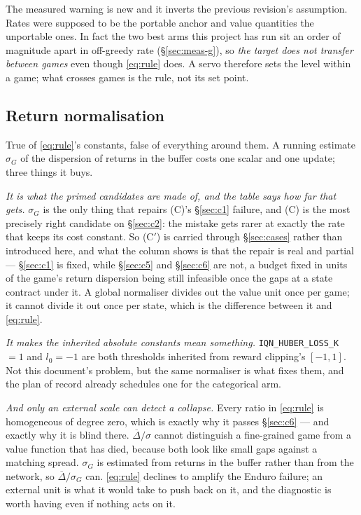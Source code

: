 \documentclass{article}
\newcommand{\gapbar}{\overline{\Delta}}
\newcommand{\srank}{\sigma}
\newcommand{\snorm}{\sigma_{G}}
\begin{document}
The measured warning is new and it inverts the previous revision's assumption. Rates were
supposed to be the portable anchor and value quantities the unportable ones. In fact the two best
arms this project has run sit an order of magnitude apart in off-greedy rate
(\S\ref{sec:meas-g}), so \emph{the target does not
transfer between games} even though \eqref{eq:rule} does. A servo therefore sets the level within
a game; what crosses games is the rule, not its set point.

\subsection{Return normalisation}
\label{sec:norm}

True of \eqref{eq:rule}'s constants, false of everything around them. A running estimate
$\snorm$ of the dispersion of returns in the buffer costs one scalar and one update; three
things it buys.

\emph{It is what the primed candidates are made of, and the table says how far that gets.}
$\snorm$ is the only thing that repairs (C)'s \S\ref{sec:c1} failure, and (C) is the most
precisely right candidate on \S\ref{sec:c2}: the mistake gets rarer at exactly the rate that
keeps its cost constant. So (C$'$) is carried through \S\ref{sec:cases} rather than introduced
here, and what the column shows is that the repair is real and partial --- \S\ref{sec:c1} is
fixed, while \S\ref{sec:c5} and \S\ref{sec:c6} are not, a budget fixed in units of the game's
return dispersion being still infeasible once the gaps at a state contract under it. A global
normaliser divides out the value unit once per game; it cannot divide it out once per state,
which is the difference between it and \eqref{eq:rule}.

\emph{It makes the inherited absolute constants mean something.} \texttt{IQN\_HUBER\_LOSS\_K} $=
1$ and $l_0 = -1$ are both thresholds inherited from reward clipping's $[-1,1]$. Not this
document's problem, but the same normaliser is what fixes them, and the plan of record already
schedules one for the categorical arm.

\emph{And only an external scale can detect a collapse.} Every ratio in \eqref{eq:rule} is
homogeneous of degree zero, which is exactly why it passes \S\ref{sec:c6} --- and exactly why it
is blind there. $\gapbar/\srank$ cannot distinguish a fine-grained game from a value function
that has died, because both look like small gaps against a matching spread. $\snorm$ is
estimated from returns in the buffer rather than from the network, so $\gapbar/\snorm$ can.
\eqref{eq:rule} declines to amplify the Enduro failure; an external unit is what it would take to
push back on it, and the diagnostic is worth having even if nothing acts on it.
\end{document}
